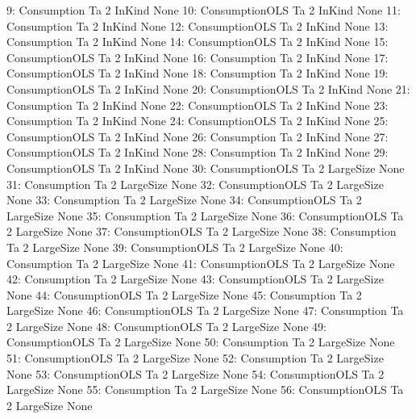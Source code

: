 \begin{Schunk}
\begin{Soutput}
 9:    Consumption      Ta     2     InKind       None
10: ConsumptionOLS      Ta     2     InKind       None
11:    Consumption      Ta     2     InKind       None
12: ConsumptionOLS      Ta     2     InKind       None
13:    Consumption      Ta     2     InKind       None
14: ConsumptionOLS      Ta     2     InKind       None
15: ConsumptionOLS      Ta     2     InKind       None
16:    Consumption      Ta     2     InKind       None
17: ConsumptionOLS      Ta     2     InKind       None
18:    Consumption      Ta     2     InKind       None
19: ConsumptionOLS      Ta     2     InKind       None
20: ConsumptionOLS      Ta     2     InKind       None
21:    Consumption      Ta     2     InKind       None
22: ConsumptionOLS      Ta     2     InKind       None
23:    Consumption      Ta     2     InKind       None
24: ConsumptionOLS      Ta     2     InKind       None
25: ConsumptionOLS      Ta     2     InKind       None
26:    Consumption      Ta     2     InKind       None
27: ConsumptionOLS      Ta     2     InKind       None
28:    Consumption      Ta     2     InKind       None
29: ConsumptionOLS      Ta     2     InKind       None
30: ConsumptionOLS      Ta     2  LargeSize       None
31:    Consumption      Ta     2  LargeSize       None
32: ConsumptionOLS      Ta     2  LargeSize       None
33:    Consumption      Ta     2  LargeSize       None
34: ConsumptionOLS      Ta     2  LargeSize       None
35:    Consumption      Ta     2  LargeSize       None
36: ConsumptionOLS      Ta     2  LargeSize       None
37: ConsumptionOLS      Ta     2  LargeSize       None
38:    Consumption      Ta     2  LargeSize       None
39: ConsumptionOLS      Ta     2  LargeSize       None
40:    Consumption      Ta     2  LargeSize       None
41: ConsumptionOLS      Ta     2  LargeSize       None
42:    Consumption      Ta     2  LargeSize       None
43: ConsumptionOLS      Ta     2  LargeSize       None
44: ConsumptionOLS      Ta     2  LargeSize       None
45:    Consumption      Ta     2  LargeSize       None
46: ConsumptionOLS      Ta     2  LargeSize       None
47:    Consumption      Ta     2  LargeSize       None
48: ConsumptionOLS      Ta     2  LargeSize       None
49: ConsumptionOLS      Ta     2  LargeSize       None
50:    Consumption      Ta     2  LargeSize       None
51: ConsumptionOLS      Ta     2  LargeSize       None
52:    Consumption      Ta     2  LargeSize       None
53: ConsumptionOLS      Ta     2  LargeSize       None
54: ConsumptionOLS      Ta     2  LargeSize       None
55:    Consumption      Ta     2  LargeSize       None
56: ConsumptionOLS      Ta     2  LargeSize       None

\end{Soutput}
\end{Schunk}
